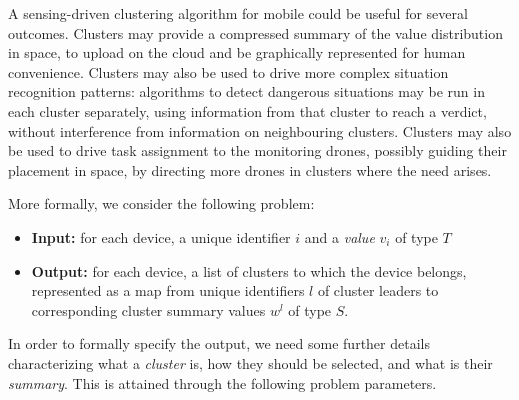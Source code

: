 A sensing-driven clustering algorithm for mobile  could be useful for several outcomes.
 Clusters may provide a compressed summary of the value distribution in space,
 to upload on the cloud and be graphically represented for human convenience.
%
Clusters may also be used to drive more complex situation recognition patterns:
 algorithms to detect dangerous situations may be run in each cluster separately,
 using information from that cluster to reach a verdict, without interference from information on neighbouring clusters.
 Clusters may also be used to drive task assignment to the monitoring drones,
 possibly guiding their placement in space, by directing more drones in clusters where the need arises.

More formally, we consider the following problem:
\begin{itemize}
	\item \textbf{Input:} for each device, a unique identifier $i$ and a \emph{value} $v_i$ of type $T$ 
	\item \textbf{Output:} for each device, a list of clusters to which the device belongs, represented as a map from unique identifiers $l$ of cluster leaders to corresponding cluster summary values $w^l$ of type $S$.
\end{itemize}
In order to formally specify the output, we need some further details characterizing what a \emph{cluster} is, how they should be selected, and what is their \emph{summary}. This is attained through the following problem parameters.
